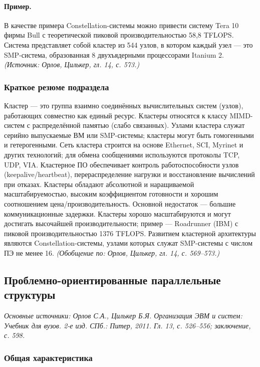 \documentclass[a4paper,12pt]{article}
\begin{document}
\paragraph{Пример.}
В качестве примера Constellation-системы можно привести систему Tera 10 фирмы Bull с теоретической пиковой производительностью 58,8 TFLOPS. Система представляет собой кластер из 544 узлов, в котором каждый узел — это SMP-система, образованная 8 двухъядерными процессорами Itanium 2.
\textit{(Источник: Орлов, Цилькер, гл. 14, с. 573.)}

\subsubsection{Краткое резюме подраздела}
Кластер — это группа взаимно соединённых вычислительных систем (узлов), работающих совместно как единый ресурс. Кластеры относятся к классу MIMD-систем с распределённой памятью (слабо связанных). Узлами кластера служат серийно выпускаемые ВМ или SMP-системы; кластеры могут быть гомогенными и гетерогенными. Сеть кластера строится на основе Ethernet, SCI, Myrinet и других технологий; для обмена сообщениями используются протоколы TCP, UDP, VIA. Кластерное ПО обеспечивает контроль работоспособности узлов (keepalive/heartbeat), перераспределение нагрузки и восстановление вычислений при отказах. Кластеры обладают абсолютной и наращиваемой масштабируемостью, высоким коэффициентом готовности и хорошим соотношением цена/производительность. Основной недостаток — большие коммуникационные задержки. Кластеры хорошо масштабируются и могут достигать высочайшей производительности; пример — Roadrunner (IBM) с пиковой производительностью 1376 TFLOPS. Развитием кластерной архитектуры являются Constellation-системы, узлами которых служат SMP-системы с числом ПЭ не менее 16.
\textit{(Обобщение по: Орлов, Цилькер, гл. 14, с. 569--573.)}

\subsection{Проблемно-ориентированные параллельные структуры}

\noindent\textit{Основные источники: Орлов С.А., Цилькер Б.Я. Организация ЭВМ и систем: Учебник для вузов. 2-е изд. СПб.: Питер, 2011. Гл. 13, с. 526--556; заключение, с. 598.}

\subsubsection{Общая характеристика}
\end{document}
